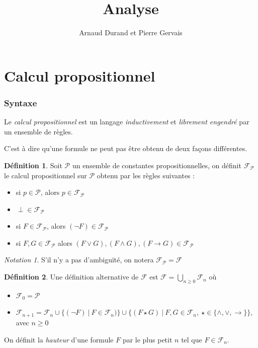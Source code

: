 \documentclass[]{article}
\title{Analyse}
\author{Arnaud Durand et Pierre Gervais}
\theoremstyle{remark}
\newtheorem{mynot}{Notation}
\theoremstyle{definition}
\newtheorem{mydef}{Définition}
\begin{document}
\maketitle

\tableofcontents

\part{Calcul propositionnel}

\section{Syntaxe}

Le \textit{calcul propositionnel} est un langage \textit{inductivement} et \textit{librement engendré} par un ensemble de règles.

C'est à dire qu'une formule ne peut pas être obtenu de deux façons différentes.

\begin{mydef}	
	Soit $\mathcal{P}$ un ensemble de constantes propositionnelles, on définit $\mathcal{F}_\mathcal{P}$ le calcul propositionnel sur $\mathcal{P}$ obtenu par les règles suivantes :
	\begin{itemize}
		\item si $p \in \mathcal{P}$, alors $p \in \mathcal{F}_\mathcal{P}$
		
		\item $\perp \in \mathcal{F}_\mathcal{P}$
		
		\item si $F \in \mathcal{F}_\mathcal{P}$, alors $\left(\neg F\right) \in \mathcal{F}_\mathcal{P}$
		
		\item si $F, G \in \mathcal{F}_\mathcal{P}$ alors $(F \lor G), (F \land G), (F \rightarrow G) \in \mathcal{F}_\mathcal{P}$
	\end{itemize}
\end{mydef}

\begin{mynot}
	S'il n'y a pas d'ambiguïté, on notera $\mathcal{F}_\mathcal{P} = \mathcal{F}$
\end{mynot}

\begin{mydef}
	Une définition alternative de $\mathcal{F}$ est $\displaystyle \mathcal{F} = \bigcup_{n \geqslant 0} \mathcal{F}_n$
	où
	\begin{itemize}
		\item $\mathcal{F}_0 = \mathcal{P}$
		\item $\mathcal{F}_{n+1} = \mathcal{F}_n \cup \{(\neg F) ~ | ~ F \in \mathcal{F}_n)\} \cup \{(F \star G) ~ | ~ F, G \in \mathcal{F}_n, ~ \star \in \{\land, \lor, \rightarrow\}\}$, avec $n \geqslant 0$
	\end{itemize}
	
	On définit la \textit{hauteur} d'une formule $F$ par le plus petit $n$ tel que $F \in \mathcal{F}_n$.
\end{mydef}
\end{document}
